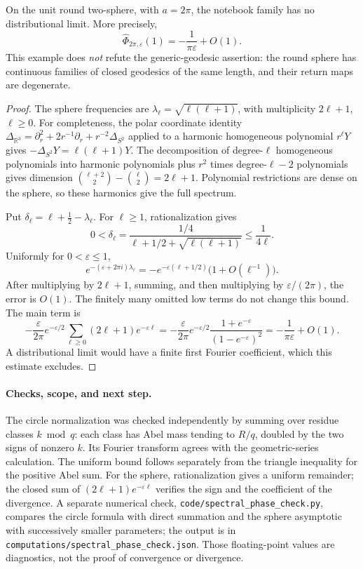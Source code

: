 \begin{example}\ours\quad
On the unit round two-sphere, with \(a=2\pi\), the notebook family has
no distributional limit. More precisely,
\[
 \widehat\Phi_{2\pi,\varepsilon}(1)
     =-\frac1{\pi\varepsilon}+O(1).
\]
This example does \emph{not} refute the generic-geodesic assertion:
the round sphere has continuous families of closed geodesics of the
same length, and their return maps are degenerate.
\end{example}
\begin{proof}
The sphere frequencies are \(\lambda_\ell=\sqrt{\ell(\ell+1)}\), with
multiplicity \(2\ell+1\), \(\ell\geq0\). For completeness, the polar
coordinate identity
\(\Delta_{\mathbb R^3}=\partial_r^2+2r^{-1}\partial_r+r^{-2}\Delta_{S^2}\)
applied to a harmonic homogeneous polynomial \(r^\ell Y\) gives
\(-\Delta_{S^2}Y=\ell(\ell+1)Y\).
The decomposition of degree-\(\ell\) homogeneous polynomials into
harmonic polynomials plus \(r^2\) times degree-\(\ell-2\) polynomials
gives dimension
\(\binom{\ell+2}{2}-\binom{\ell}{2}=2\ell+1\).
Polynomial restrictions are dense on the sphere, so these harmonics
give the full spectrum.

Put \(\delta_\ell=\ell+\tfrac12-\lambda_\ell\).
For \(\ell\geq1\), rationalization gives
\[
 0<\delta_\ell=
 \frac{1/4}{\ell+1/2+\sqrt{\ell(\ell+1)}}
       \leq\frac1{4\ell}.
\]
Uniformly for \(0<\varepsilon\leq1\),
\[
 e^{-(\varepsilon+2\pi i)\lambda_\ell}
 =-e^{-\varepsilon(\ell+1/2)}
       \bigl(1+O(\ell^{-1})\bigr).
\]
After multiplying by \(2\ell+1\), summing, and then multiplying by
\(\varepsilon/(2\pi)\), the error is \(O(1)\).
The finitely many omitted low terms do not change this bound. The main
term is
\[
 -\frac{\varepsilon}{2\pi}e^{-\varepsilon/2}
       \sum_{\ell\geq0}(2\ell+1)e^{-\varepsilon\ell}
 =-\frac{\varepsilon}{2\pi}e^{-\varepsilon/2}
       \frac{1+e^{-\varepsilon}}{(1-e^{-\varepsilon})^2}
 =-\frac1{\pi\varepsilon}+O(1).
\]
A distributional limit would have a finite first Fourier coefficient,
which this estimate excludes.
\end{proof}

\paragraph{Checks, scope, and next step.}
The circle normalization was checked independently by summing over
residue classes \(k\bmod q\): each class has Abel mass tending to
\(R/q\), doubled by the two signs of nonzero \(k\). Its Fourier
transform agrees with the geometric-series calculation. The uniform
bound follows separately from the triangle inequality for the positive
Abel sum. For the sphere, rationalization gives a uniform remainder;
the closed sum of \((2\ell+1)e^{-\varepsilon\ell}\) verifies the sign
and the coefficient of the divergence. A separate numerical check,
\texttt{code/spectral\_phase\_check.py}, compares the circle formula
with direct summation and the sphere asymptotic with successively
smaller parameters; the output is in
\texttt{computations/spectral\_phase\_check.json}. Those floating-point
values are diagnostics, not the proof of convergence or divergence.

